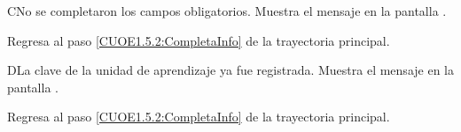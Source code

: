\begin{UCtrayectoriaA}{C}{No se completaron los campos obligatorios.}
	\UCpaso [\UCsist] Muestra el mensaje  en la pantalla . 
	
	\UCpaso Regresa al paso \ref{CUOE1.5.2:CompletaInfo} de la trayectoria principal.
\end{UCtrayectoriaA}

\begin{UCtrayectoriaA}{D}{La clave de la unidad de aprendizaje ya fue registrada.}
	\UCpaso [\UCsist] Muestra el mensaje  en la pantalla .
	
	\UCpaso Regresa al paso \ref{CUOE1.5.2:CompletaInfo} de la trayectoria principal.
\end{UCtrayectoriaA}


